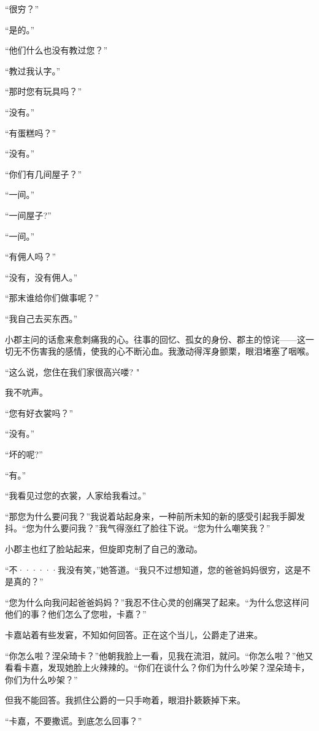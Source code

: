 \documentclass[12pt, UTF8]{ctexbook}
\begin{document}
\par “很穷？”
\par “是的。”
\par “他们什么也没有教过您？”
\par “教过我认字。”
\par “那时您有玩具吗？”
\par “没有。”
\par “有蛋糕吗？”
\par “没有。”
\par “你们有几间屋子？”
\par “一间。”
\par “一间屋子?”
\par “一间。”
\par “有佣人吗？”
\par “没有，没有佣人。”
\par “那末谁给你们做事呢？”
\par “我自己去买东西。”
\par 小郡主问的话愈来愈刺痛我的心。往事的回忆、孤女的身份、郡主的惊诧——这一切无不伤害我的感情，使我的心不断沁血。我激动得浑身颤栗，眼泪堵塞了咽喉。
\par “这么说，您住在我们家很高兴喽? "
\par 我不吭声。
\par “您有好衣裳吗？”
\par “没有。”
\par “坏的呢?”
\par “有。”
\par “我看见过您的衣裳，人家给我看过。”
\par “那您为什么要问我？”我说着站起身来，一种前所未知的新的感受引起我手脚发抖。“您为什么要问我？”我气得涨红了脸往下说。“您为什么嘲笑我？”
\par 小郡主也红了脸站起来，但旋即克制了自己的激动。
\par “不······我没有笑，”她答道。“我只不过想知道，您的爸爸妈妈很穷，这是不是真的？”
\par “您为什么向我问起爸爸妈妈？”我忍不住心灵的创痛哭了起来。“为什么您这样问他们的事？他们怎么了您啦，卡嘉？”
\par 卡嘉站着有些发窘，不知如何回答。正在这个当儿，公爵走了进来。
\par “你怎么啦？涅朵琦卡？”他朝我脸上一看，见我在流泪，就问。“你怎么啦？”他又看看卡嘉，发现她脸上火辣辣的。“你们在谈什么？你们为什么吵架？涅朵琦卡，你们为什么吵架？”
\par 但我不能回答。我抓住公爵的一只手吻着，眼泪扑簌簌掉下来。
\par “卡嘉，不要撒谎。到底怎么回事？”
\end{document}
